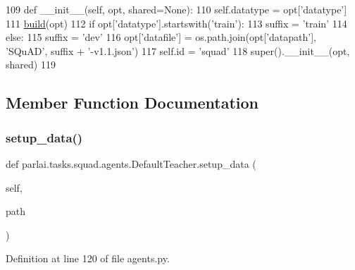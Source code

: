 \begin{DoxyCode}
109     \textcolor{keyword}{def }\_\_init\_\_(self, opt, shared=None):
110         self.datatype = opt[\textcolor{stringliteral}{'datatype'}]
111         \hyperlink{namespaceparlai_1_1mturk_1_1tasks_1_1talkthewalk_1_1download_a8c0fbb9b6dfe127cb8c1bd6e7c4e33fd}{build}(opt)
112         \textcolor{keywordflow}{if} opt[\textcolor{stringliteral}{'datatype'}].startswith(\textcolor{stringliteral}{'train'}):
113             suffix = \textcolor{stringliteral}{'train'}
114         \textcolor{keywordflow}{else}:
115             suffix = \textcolor{stringliteral}{'dev'}
116         opt[\textcolor{stringliteral}{'datafile'}] = os.path.join(opt[\textcolor{stringliteral}{'datapath'}], \textcolor{stringliteral}{'SQuAD'}, suffix + \textcolor{stringliteral}{'-v1.1.json'})
117         self.id = \textcolor{stringliteral}{'squad'}
118         super().\_\_init\_\_(opt, shared)
119 
\end{DoxyCode}


\subsection{Member Function Documentation}
\mbox{\label{classparlai_1_1tasks_1_1squad_1_1agents_1_1DefaultTeacher_a868b9ad003719c4fb50dd3b292007368}} 
\subsubsection{\texorpdfstring{setup\+\_\+data()}{setup\_data()}}
{\footnotesize\ttfamily def parlai.\+tasks.\+squad.\+agents.\+Default\+Teacher.\+setup\+\_\+data (\begin{DoxyParamCaption}\item[{}]{self,  }\item[{}]{path }\end{DoxyParamCaption})}



Definition at line 120 of file agents.\+py.


